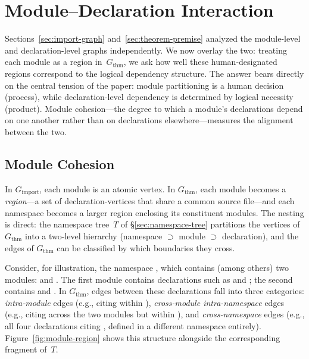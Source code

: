 \section{Module--Declaration Interaction}
\label{sec:module-declaration}

Sections~\ref{sec:import-graph} and~\ref{sec:theorem-premise} analyzed the module-level and declaration-level graphs independently. We now overlay the two: treating each module as a region in~$G_{\mathrm{thm}}$, we ask how well these human-designated regions correspond to the logical dependency structure. The answer bears directly on the central tension of the paper: module partitioning is a human decision (process), while declaration-level dependency is determined by logical necessity (product). Module cohesion---the degree to which a module's declarations depend on one another rather than on declarations elsewhere---measures the alignment between the two.

\subsection{Module Cohesion}
\label{sec:cohesion}

In $G_{\mathrm{import}}$, each module is an atomic vertex. In $G_{\mathrm{thm}}$, each module becomes a \emph{region}---a set of declaration-vertices that share a common source file---and each namespace becomes a larger region enclosing its constituent modules. The nesting is direct: the namespace tree~$T$ of \S\ref{sec:namespace-tree} partitions the vertices of $G_{\mathrm{thm}}$ into a two-level hierarchy (namespace $\supset$ module $\supset$ declaration), and the edges of $G_{\mathrm{thm}}$ can be classified by which boundaries they cross.

Consider, for illustration, the namespace , which contains (among others) two modules:  and . The first module contains declarations such as  and ; the second contains  and . In $G_{\mathrm{thm}}$, edges between these declarations fall into three categories: \emph{intra-module} edges (e.g.,  citing  within ), \emph{cross-module intra-namespace} edges (e.g.,  citing  across the two modules but within ), and \emph{cross-namespace} edges (e.g., all four declarations citing , defined in a different namespace entirely). Figure~\ref{fig:module-region} shows this structure alongside the corresponding fragment of~$T$.


